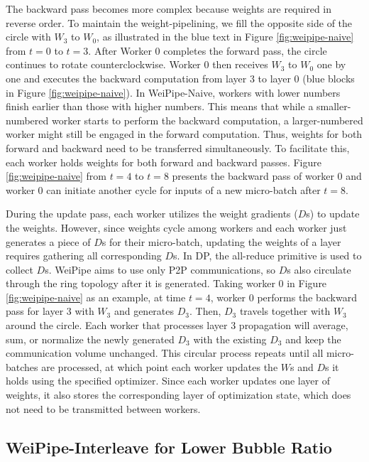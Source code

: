 \documentclass[sigplan,review,anonymous]{acmart}
\begin{document}
The backward pass becomes more complex because weights are required in reverse order. To maintain the weight-pipelining, we fill the opposite side of the circle with $W_3$ to $W_0$, as illustrated in the blue text in Figure \ref{fig:weipipe-naive} from $t=0$ to $t=3$. After Worker 0 completes the forward pass, the circle continues to rotate counterclockwise. Worker 0 then receives $W_3$ to $W_0$ one by one and executes the backward computation from layer 3 to layer 0 (blue blocks in Figure \ref{fig:weipipe-naive}). In WeiPipe-Naive, workers with lower numbers finish earlier than those with higher numbers. This means that while a smaller-numbered worker starts to perform the backward computation, a larger-numbered worker might still be engaged in the forward computation. Thus, weights for both forward and backward need to be transferred simultaneously. To facilitate this, each worker holds weights for both forward and backward passes. Figure \ref{fig:weipipe-naive} from $t=4$ to $t=8$ presents the backward pass of worker 0 and worker 0 can initiate another cycle for inputs of a new micro-batch after $t=8$. 

During the update pass, each worker utilizes the weight gradients ($D$s) to update the weights. However, since weights cycle among workers and each worker just generates a piece of $D$s for their micro-batch, updating the weights of a layer requires gathering all corresponding $D$s. In DP, the all-reduce primitive is used to collect $D$s. WeiPipe aims to use only P2P communications, so $D$s also circulate through the ring topology after it is generated. Taking worker 0 in Figure \ref{fig:weipipe-naive} as an example, at time $t=4$, worker 0 performs the backward pass for layer 3 with $W_3$ and generates $D_3$. Then, $D_3$ travels together with $W_3$ around the circle. Each worker that processes layer 3 propagation will average, sum, or normalize the newly generated $D_3$ with the existing $D_3$ and keep the communication volume unchanged. This circular process repeats until all micro-batches are processed, at which point each worker updates the $W$s and $D$s it holds using the specified optimizer. Since each worker updates one layer of weights, it also stores the corresponding layer of optimization state, which does not need to be transmitted between workers.


\subsection{WeiPipe-Interleave for Lower Bubble Ratio}  
\end{document}
